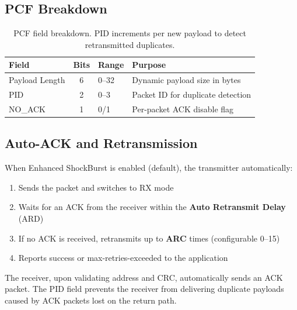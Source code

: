 \documentclass[11pt,a4paper]{article}
\begin{document}
\subsection{PCF Breakdown}

\begin{table}[htbp]
\centering
\caption{PCF field breakdown. PID increments per new payload to detect retransmitted duplicates.}
\begin{tabular}{l c l l}
\toprule
\textbf{Field} & \textbf{Bits} & \textbf{Range} & \textbf{Purpose} \\
\midrule
Payload Length & 6 & 0--32 & Dynamic payload size in bytes \\
PID & 2 & 0--3 & Packet ID for duplicate detection \\
NO\_ACK & 1 & 0/1 & Per-packet ACK disable flag \\
\bottomrule
\end{tabular}
\label{tab:pcf}
\end{table}

\subsection{Auto-ACK and Retransmission}

When Enhanced ShockBurst is enabled (default), the transmitter automatically:

\begin{enumerate}
  \item Sends the packet and switches to RX mode
  \item Waits for an ACK from the receiver within the \textbf{Auto Retransmit Delay} (ARD)
  \item If no ACK is received, retransmits up to \textbf{ARC} times (configurable 0--15)
  \item Reports success or max-retries-exceeded to the application
\end{enumerate}

The receiver, upon validating address and CRC, automatically sends an ACK packet. The PID field prevents the receiver from delivering duplicate payloads caused by ACK packets lost on the return path.

\end{document}
